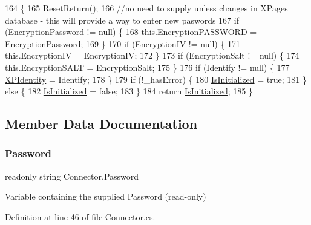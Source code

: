 \begin{DoxyCode}
164                                                                                                            
                                          \{
165         ResetReturn();
166         \textcolor{comment}{//no need to supply unless changes in XPages database - this will provide a way to enter new
       paswords}
167         \textcolor{keywordflow}{if} (EncryptionPassword != null) \{
168             this.EncryptionPASSWORD = EncryptionPassword;
169         \}
170         \textcolor{keywordflow}{if} (EncryptionIV != null) \{
171             this.EncryptionIV = EncryptionIV;
172         \}
173         \textcolor{keywordflow}{if} (EncryptionSalt != null) \{
174             this.EncryptionSALT = EncryptionSalt;
175         \}
176         \textcolor{keywordflow}{if} (Identify != null) \{
177             \mbox{\hyperlink{class_connector_a092e3e36f92c129c07c57df9b8fb91ca}{XPIdentity}} = Identify;
178         \}
179         \textcolor{keywordflow}{if} (!\_hasError) \{
180             \mbox{\hyperlink{class_connector_ae9cbe0b51d601dab13ba7271db4f3883}{IsInitialized}} = \textcolor{keyword}{true};
181         \} \textcolor{keywordflow}{else} \{
182             \mbox{\hyperlink{class_connector_ae9cbe0b51d601dab13ba7271db4f3883}{IsInitialized}} = \textcolor{keyword}{false};
183         \}
184         \textcolor{keywordflow}{return} \mbox{\hyperlink{class_connector_ae9cbe0b51d601dab13ba7271db4f3883}{IsInitialized}};
185     \}
\end{DoxyCode}


\subsection{Member Data Documentation}
\mbox{\label{class_connector_a7dd469898462ef761d256392766461fe}} 
\subsubsection{\texorpdfstring{Password}{Password}}
{\footnotesize\ttfamily readonly string Connector.\+Password}



Variable containing the supplied Password (read-\/only) 



Definition at line 46 of file Connector.\+cs.

